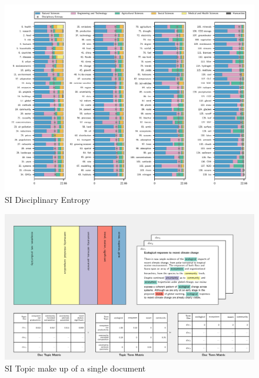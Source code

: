 \documentclass{article}
\begin{document}
\begin{linenumbers}
	\begin{figure}
		\begin{center}
			\includegraphics[width=1\linewidth]{plots_pub/topic_oecd_entropy.pdf}
			\caption{SI Disciplinary Entropy}
			\label{dis-entropy}
		\end{center}
	\end{figure}	
	
	
	
	\begin{figure}
		\begin{center}
			\includegraphics[width=1\linewidth]{plots_pub/single_doc_3_536594_1861.pdf}
			\caption{SI Topic make up of a single document}
			\label{doc-topic}
		\end{center}
	\end{figure}


\end{linenumbers}
\end{document}
